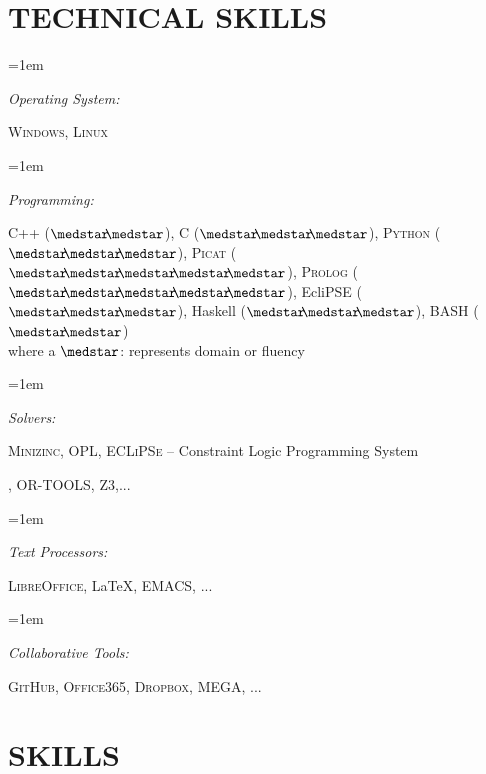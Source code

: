 \documentclass[paper=a4,fontsize=11pt]{scrartcl} %
\newlength{\spacebox}
\newcommand{\NewPart}[1]{\section*{\uppercase{#1}}}
\newcommand{\PersonalEntry}[2]{
		\noindent\hangindent=2em\hangafter=0 %
		\parbox{\spacebox}{        %
		\textit{#1}}		       %
		\hspace{1.5em} #2 \par}    %
\newcommand{\SkillsEntry}[2]{      %
		\noindent\hangindent=1em\hangafter=0 %
		\parbox{\spacebox}{        %
		\textit{#1}}			   %
		\hspace{1.2em} #2 \par}    %
\begin{document}
\NewPart{Technical Skills}{}

\SkillsEntry{Operating System:} {\textsc{Windows}, \textsc{Linux}}

\SkillsEntry{Programming:} {\textsc{C++} ($\medstar\hspace{-1mm}\medstar$), \textsc{C} ($\medstar\hspace{-1mm}\medstar\hspace{-1mm}\medstar$), \textsc{Python} ($\medstar\hspace{-1mm}\medstar\hspace{-1mm}\medstar$), \textsc{Picat} ($\medstar\hspace{-1mm}\medstar\hspace{-1mm}\medstar\hspace{-1mm}\medstar\hspace{-1mm}\medstar$),  \textsc{Prolog} 
($\medstar\hspace{-1mm}\medstar\hspace{-1mm}\medstar\hspace{-1mm}\medstar\hspace{-1mm}\medstar$), EcliPSE
($\medstar\hspace{-1mm}\medstar\hspace{-1mm}\medstar$), Haskell 
($\medstar\hspace{-1mm}\medstar\hspace{-1mm}\medstar$), BASH ($\medstar\hspace{-1mm}\medstar$) \\ where a $\medstar$: represents domain or fluency}

\SkillsEntry{Solvers:} {\textsc{Minizinc}, \textsc{OPL}, \textsc{ECLiPSe} -- Constraint Logic Programming System}, \textsc{OR-TOOLS},  \textsc{Z3},... 

\SkillsEntry{Text Processors:} {\textsc{LibreOffice}, \LaTeX, \textsc{EMACS}, ...}

\SkillsEntry{Collaborative Tools:}  {\textsc{GitHub}, \textsc{Office365}, \textsc{Dropbox}, \textsc{MEGA}, ...}


\NewPart{Skills}{}
\end{document}
